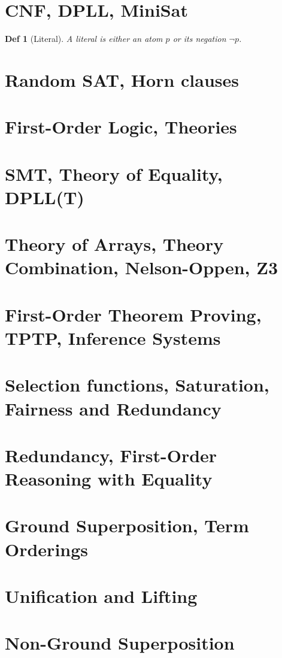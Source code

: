 \documentclass[]{article}
\newtheorem*{definition*}{Def}
\begin{document}
\section{CNF, DPLL, MiniSat}

\begin{definition*}[Literal]
	A literal is either an atom $p$ or its negation $\lnot p$.
\end{definition*}

\section{Random SAT, Horn clauses}

\section{First-Order Logic, Theories}

\section{SMT, Theory of Equality, DPLL(T)}

\section{Theory of Arrays, Theory Combination, Nelson-Oppen, Z3}

\section{First-Order Theorem Proving, TPTP, Inference Systems}

\section{Selection functions, Saturation, Fairness and Redundancy}

\section{Redundancy, First-Order Reasoning with Equality}

\section{Ground Superposition, Term Orderings}

\section{Unification and Lifting}

\section{Non-Ground Superposition}
\end{document}
